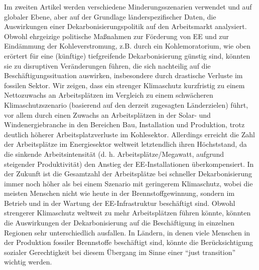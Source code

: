 \documentclass[../thesis.tex]{subfiles}
\begin{document}
Im zweiten Artikel werden verschiedene Minderungsszenarien verwendet %
 und auf globaler Ebene, aber auf der Grundlage länderspezifischer Daten, die Auswirkungen einer Dekarbonisierungspolitik auf den Arbeitsmarkt analysiert. Obwohl ehrgeizige politische Ma\ss nahmen zur Förderung von EE und zur Eindämmung der Kohleverstromung, z.B. durch ein Kohlemoratorium, wie oben erörtert für eine (künftige) tiefgreifende Dekarbonisierung günstig sind, könnten sie zu disruptiven Veränderungen führen, die sich nachteilig auf die Beschäftigungssituation auswirken, insbesondere durch drastische Verluste im fossilen Sektor. Wir zeigen, dass ein strenger Klimaschutz kurzfristig zu einem Nettozuwachs an Arbeitsplätzen im Vergleich zu einem schwächeren Klimaschutzszenario (basierend auf den derzeit zugesagten Länderzielen) führt, vor allem durch einen Zuwachs an Arbeitsplätzen in der Solar- und Windenergiebranche in den Bereichen Bau, Installation und Produktion, trotz deutlich höherer Arbeitsplatzverluste im Kohlesektor. Allerdings erreicht die Zahl der Arbeitsplätze im Energiesektor weltweit letztendlich ihren Höchststand, da die sinkende Arbeitsintensität (d. h. Arbeitsplätze/Megawatt, aufgrund steigender Produktivität) den Anstieg der EE-Installationen überkompensiert. In der Zukunft ist die Gesamtzahl der Arbeitsplätze bei schneller Dekarbonisierung immer noch höher als bei einem Szenario mit geringerem Klimaschutz, wobei die meisten Menschen nicht wie heute in der Brennstoffgewinnung, sondern im Betrieb und in der Wartung der EE-Infrastruktur beschäftigt sind. Obwohl strengerer Klimaschutz weltweit zu mehr Arbeitsplätzen führen könnte, könnten die Auswirkungen der Dekarbonisierung auf die Beschäftigung in einzelnen Regionen sehr unterschiedlich ausfallen. In Ländern, in denen viele Menschen in der Produktion fossiler Brennstoffe beschäftigt sind, könnte die Berücksichtigung sozialer Gerechtigkeit bei diesem Übergang im Sinne einer "`just transition"' wichtig werden.
\end{document}
